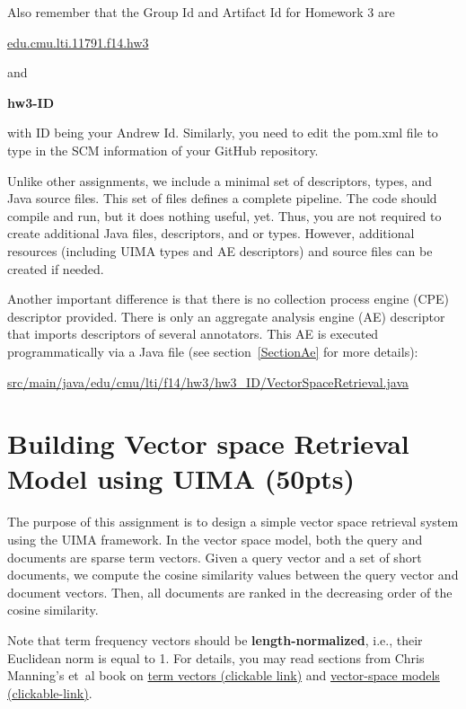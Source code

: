 \documentclass[oneside,11pt]{memoir}
\begin{document}
Also remember that the Group Id and Artifact Id for Homework 3 are

\begin{center}
\url{edu.cmu.lti.11791.f14.hw3}
\end{center}

and 

\begin{center}\textbf{hw3-ID }\end{center}
with ID being your Andrew Id.
Similarly, you need to edit the pom.xml file to type in the SCM information of
your GitHub repository. 

Unlike other assignments, 
we include a minimal set of descriptors, types, and Java source files.
This set of files defines a complete pipeline. 
The code should compile and run, but it does nothing useful, yet.
Thus, you are not required
to create additional Java files, descriptors, and or types.
However, additional resources (including UIMA types 
and AE descriptors) and source files can be created if needed.

Another important difference is that there is no collection process engine (CPE) descriptor provided.
There is only an aggregate analysis engine (AE) descriptor that imports descriptors of several annotators.
This AE is executed programmatically via a Java file (see section~\ref{SectionAe} for more details):

\begin{center}\url{src/main/java/edu/cmu/lti/f14/hw3/hw3_ID/VectorSpaceRetrieval.java} \end{center}

\chapter{Building Vector space Retrieval Model using UIMA (50pts)}
\label{SectionBuildVS}

The purpose of this assignment is to design a simple vector space retrieval system using the UIMA
framework. 
In the vector space model,
both the query and documents are sparse term vectors.
Given a query vector and a set of short documents, 
we compute the cosine similarity values between the query vector and document vectors.
Then, all documents are ranked in the decreasing order of the cosine similarity.

Note that term frequency vectors should be \textbf{length-normalized}, i.e., their
Euclidean norm is equal to 1. For details, you may read
sections from Chris Manning's et~al book on \href{http://nlp.stanford.edu/IR-book/html/htmledition/term-frequency-and-weighting-1.html#sec:secbagofwords}{term vectors (clickable link)} and \href{http://nlp.stanford.edu/IR-book/html/htmledition/the-vector-space-model-for-scoring-1.html}{vector-space models (clickable-link)}.
\end{document}
